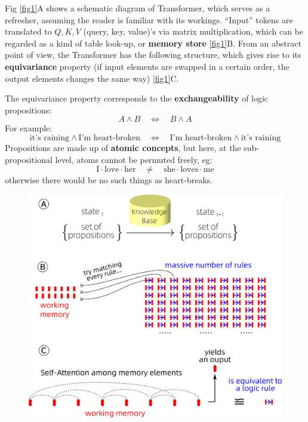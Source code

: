 \documentclass[runningheads]{llncs}
\newcommand{\circled}[1]{{\textcircled{\sffamily \scriptsize{#1}}}}
\begin{document}
Fig \ref{fig1}\circled{A} shows a schematic diagram of Transformer, which serves as a refresher, assuming the reader is familiar with its workings.  ``Input'' tokens are translated to $Q,K,V$ (query, key, value)'s via matrix multiplication, which can be regarded as a kind of table look-up, or \textbf{memory store} \ref{fig1}\circled{B}.  From an abstract point of view, the Transformer has the following structure, which gives rise to its \textbf{equivariance} property (if input elements are swapped in a certain order, the output elements changes the same way) \ref{fig1}\circled{C}.

The equivariance property corresponds to the \textbf{exchangeability} of logic propositions:
\begin{equation}
A \wedge B \quad \Leftrightarrow \quad B \wedge A
\end{equation}
For example:
\begin{equation}
\mbox{it's raining} \wedge \mbox{I'm heart-broken} \quad \Leftrightarrow \quad \mbox{I'm heart-broken} \wedge \mbox{it's raining}
\end{equation}
Propositions are made up of \textbf{atomic concepts}, but here, at the sub-propositional level, atoms cannot be permuted freely, eg:
\begin{equation}
\mbox{I} \cdot \mbox{love} \cdot \mbox{her} \quad \neq \quad \mbox{she} \cdot \mbox{loves} \cdot \mbox{me}
\end{equation}
otherwise there would be no such things as heart-breaks.

\begin{figure}[H]
	\includegraphics[scale=0.6]{fig2.png}
	\caption{}
	\label{fig2}
\end{figure}
\end{document}
